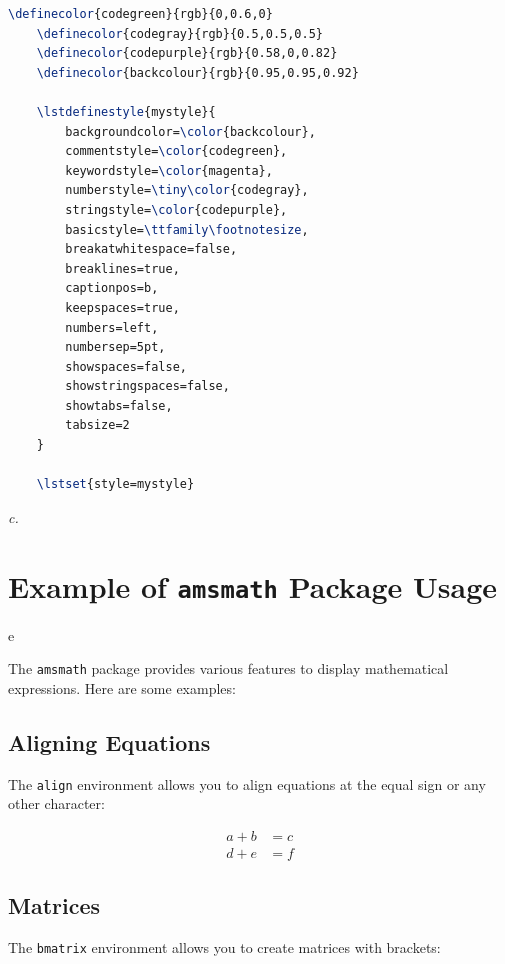 \documentclass[]{article}
\begin{document}
\begin{lstlisting}[language=TeX]
    \definecolor{codegreen}{rgb}{0,0.6,0}
    \definecolor{codegray}{rgb}{0.5,0.5,0.5}
    \definecolor{codepurple}{rgb}{0.58,0,0.82}
    \definecolor{backcolour}{rgb}{0.95,0.95,0.92}
    
    \lstdefinestyle{mystyle}{
        backgroundcolor=\color{backcolour},   
        commentstyle=\color{codegreen},
        keywordstyle=\color{magenta},
        numberstyle=\tiny\color{codegray},
        stringstyle=\color{codepurple},
        basicstyle=\ttfamily\footnotesize,
        breakatwhitespace=false,         
        breaklines=true,                 
        captionpos=b,                    
        keepspaces=true,                 
        numbers=left,                    
        numbersep=5pt,                  
        showspaces=false,                
        showstringspaces=false,
        showtabs=false,                  
        tabsize=2
    }
    
    \lstset{style=mystyle} 
\end{lstlisting}

\vspace{5mm}\textit{c.}

\section{Example of \texttt{amsmath} Package Usage}e

The \texttt{amsmath} package provides various features to display mathematical expressions. Here are some examples:

\subsection{Aligning Equations}

The \texttt{align} environment allows you to align equations at the equal sign or any other character:

\begin{align}
    a + b &= c \\
    d + e &= f
\end{align}

\subsection{Matrices}

The \texttt{bmatrix} environment allows you to create matrices with brackets:
\end{document}
